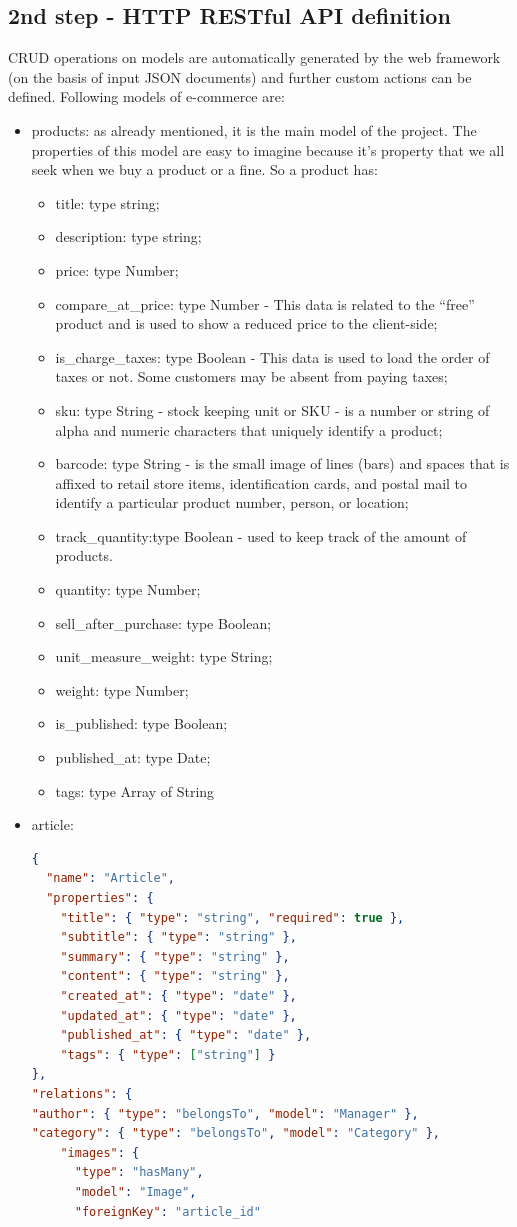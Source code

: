 \subsection{2nd step - HTTP RESTful API definition}
CRUD operations on models are automatically generated by the web framework (on the basis of input JSON documents) and further custom actions can be defined. Following models of e-commerce are:
\begin{itemize}
\item products: as already mentioned, it is the main model of the project. The properties of this model are easy to imagine because it's property that we all seek when we buy a product or a fine. So a product has:
\begin{itemize}
\item title: type string;
\item description: type string;
\item price: type Number;
\item compare\_at\_price: type Number - This data is related to the “free” product and is used to show a reduced price to the client-side;
\item is\_charge\_taxes: type Boolean - This data is used to load the order of taxes or not. Some customers may be absent from paying taxes;
\item sku: type String - stock keeping unit or SKU - is a number or string of alpha and numeric characters that uniquely identify a product;
\item barcode: type String - is the small image of lines (bars) and spaces that is affixed to retail store items, identification cards, and postal mail to identify a particular product number, person, or location;
\item track\_quantity:type Boolean - used to keep track of the amount of products.
\item quantity: type Number;
\item sell\_after\_purchase: type Boolean;
\item unit\_measure\_weight: type String;
\item weight: type Number;
\item is\_published: type Boolean;
\item published\_at: type Date;
\item tags: type Array of String
\end{itemize}
\item article:
\begin{lstlisting}[language=json]
{
  "name": "Article",
  "properties": {
    "title": { "type": "string", "required": true },
    "subtitle": { "type": "string" },
    "summary": { "type": "string" },
    "content": { "type": "string" },
    "created_at": { "type": "date" },
    "updated_at": { "type": "date" },
    "published_at": { "type": "date" },
    "tags": { "type": ["string"] }
},
"relations": {
"author": { "type": "belongsTo", "model": "Manager" },
"category": { "type": "belongsTo", "model": "Category" },
    "images": {
      "type": "hasMany",
      "model": "Image",
      "foreignKey": "article_id"


\end{lstlisting}
\end{itemize}
